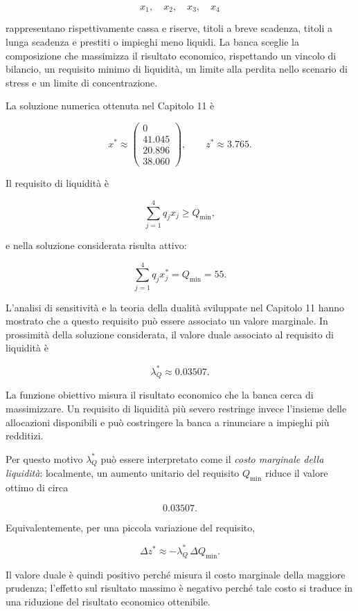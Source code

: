 \[
x_1,\quad x_2,\quad x_3,\quad x_4
\]

\noindent rappresentano rispettivamente cassa e riserve, titoli a breve scadenza, titoli
a lunga scadenza e prestiti o impieghi meno liquidi. La banca sceglie la
composizione che massimizza il risultato economico, rispettando un vincolo di
bilancio, un requisito minimo di liquidit\`a, un limite alla perdita nello
scenario di stress e un limite di concentrazione.

La soluzione numerica ottenuta nel Capitolo 11 \`e

\[
x^*
\approx
\begin{pmatrix}
0\\
41.045\\
20.896\\
38.060
\end{pmatrix},
\qquad
z^*
\approx
3.765.
\]

Il requisito di liquidit\`a \`e

\[
\sum_{j=1}^{4}q_jx_j
\geq
Q_{\min},
\]

\noindent e nella soluzione considerata risulta attivo:

\[
\sum_{j=1}^{4}q_jx_j^*
=
Q_{\min}
=
55.
\]

L'analisi di sensitivit\`a e la teoria della dualit\`a sviluppate nel
Capitolo 11 hanno mostrato che a questo requisito pu\`o essere associato un
valore marginale. In prossimit\`a della soluzione considerata, il valore duale
associato al requisito di liquidit\`a \`e

\[
\lambda_Q^*
\approx
0.03507.
\]

La funzione obiettivo misura il risultato economico che la banca cerca di
massimizzare. Un requisito di liquidit\`a pi\`u severo restringe invece
l'insieme delle allocazioni disponibili e pu\`o costringere la banca a
rinunciare a impieghi pi\`u redditizi.

Per questo motivo $\lambda_Q^*$ pu\`o essere interpretato come il
\emph{costo marginale della liquidit\`a}: localmente, un aumento unitario del
requisito $Q_{\min}$ riduce il valore ottimo di circa

\[
0.03507.
\]

Equivalentemente, per una piccola variazione del requisito,

\[
\Delta z^*
\approx
-\lambda_Q^*\,\Delta Q_{\min}.
\]

Il valore duale \`e quindi positivo perch\'e misura il costo marginale della
maggiore prudenza; l'effetto sul risultato massimo \`e negativo perch\'e tale
costo si traduce in una riduzione del risultato economico ottenibile.

